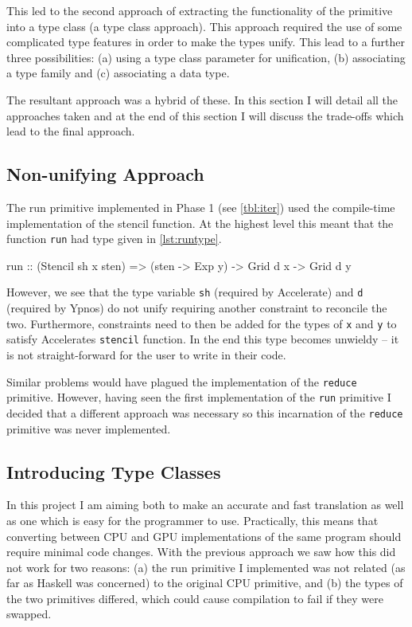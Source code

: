 \documentclass[
    12pt,
    a4paper,
    twoside,
    openright,
    ]{scrbook}
\begin{document}
This led to the second approach of extracting the functionality of the primitive
into a type class (a type class approach). This approach required the use of
some complicated type features in order to make the types unify. This lead to a
further three possibilities: (a) using a type class parameter for unification,
(b) associating a type family and (c) associating a data type.

The resultant approach was a hybrid of these. In this section I will detail all
the approaches taken and at the end of this section I will discuss the
trade-offs which lead to the final approach.

\subsection{Non-unifying Approach}
\label{sec:non-unify-appr}

The run primitive implemented in Phase 1 (see \autoref{tbl:iter}) used the
compile-time implementation of the stencil function. At the highest level this
meant that the function \texttt{run} had type given in \autoref{lst:runtype}.

\begin{hlisting}[label={lst:runtype}, caption=The type of run required by Accelerate.]
run :: (Stencil sh x sten) => (sten -> Exp y) -> Grid d x -> Grid d y
\end{hlisting}

However, we see that the type variable \texttt{sh} (required by Accelerate) and
\texttt{d} (required by Ypnos) do not unify requiring another constraint to
reconcile the two. Furthermore, constraints need to then be added for the types
of \texttt{x} and \texttt{y} to satisfy Accelerates \texttt{stencil}
function. In the end this type becomes unwieldy -- it is not straight-forward
for the user to write in their code.

Similar problems would have plagued the implementation of the \texttt{reduce}
primitive. However, having seen the first implementation of the \texttt{run}
primitive I decided that a different approach was necessary so this incarnation
of the \texttt{reduce} primitive was never implemented.

\subsection{Introducing Type Classes}

In this project I am aiming both to make an accurate and fast translation as
well as one which is easy for the programmer to use.  Practically, this means
that converting between CPU and GPU implementations of the same program should
require minimal code changes.  With the previous
approach we saw how this did not work for two reasons: (a) the run primitive I
implemented was not related (as far as Haskell was concerned) to the original
CPU primitive, and (b) the types of the two primitives differed, which could
cause compilation to fail if they were swapped.
\end{document}
